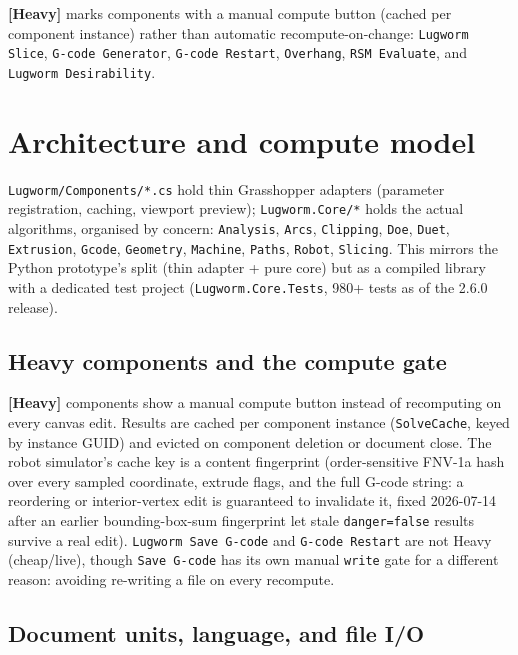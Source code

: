 \documentclass[11pt]{article}
\newcommand{\param}[1]{\texttt{#1}}
\newcommand{\heavy}{\textbf{[Heavy]}}
\begin{document}
\heavy{} marks components with a manual compute button (cached per
component instance) rather than automatic recompute-on-change: \param{Lugworm
Slice}, \param{G-code Generator}, \param{G-code Restart},
\param{Overhang}, \param{RSM Evaluate}, and \param{Lugworm
Desirability}.

\section{Architecture and compute model}

\param{Lugworm/Components/*.cs} hold thin Grasshopper adapters
(parameter registration, caching, viewport preview); \param{Lugworm.Core/*}
holds the actual algorithms, organised by concern: \param{Analysis},
\param{Arcs}, \param{Clipping}, \param{Doe}, \param{Duet},
\param{Extrusion}, \param{Gcode}, \param{Geometry}, \param{Machine},
\param{Paths}, \param{Robot}, \param{Slicing}. This mirrors the Python
prototype's split (thin adapter + pure core) but as a compiled library
with a dedicated test project (\param{Lugworm.Core.Tests}, 980+
tests as of the 2.6.0 release).

\subsection{Heavy components and the compute gate}

\heavy{} components show a manual compute button instead of
recomputing on every canvas edit. Results are cached per component
instance (\param{SolveCache}, keyed by instance GUID) and evicted on
component deletion or document close. The robot simulator's cache key
is a content fingerprint (order-sensitive FNV-1a hash over every
sampled coordinate, extrude flags, and the full G-code string: a
reordering or interior-vertex edit is guaranteed to invalidate it,
fixed 2026-07-14 after an earlier bounding-box-sum fingerprint let stale
\param{danger=false} results survive a real edit). \param{Lugworm Save
G-code} and \param{G-code Restart} are not Heavy (cheap/live),
though \param{Save G-code} has its own manual \param{write} gate for a
different reason: avoiding re-writing a file on every recompute.

\subsection{Document units, language, and file I/O}
\end{document}
